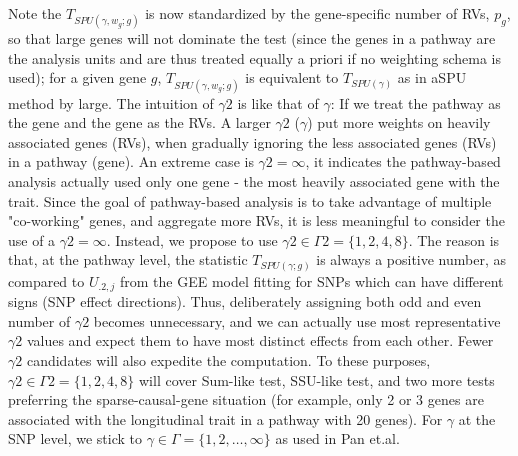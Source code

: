 \documentclass[12pt]{article}
\begin{document}
Note the $T_ { SPU(\gamma, w_g ; g) }$ is now standardized by the gene-specific number of RVs, $p_g$, so that large genes will not dominate the test (since the genes in a pathway are the analysis units and are thus treated equally a priori if no weighting schema is used); for a given gene $g$, $T_ { SPU(\gamma, w_g ; g) }$ is equivalent to $T_ { SPU(\gamma ) }$ as in aSPU method by large. The intuition of $\gamma 2$ is like that of $\gamma$: If we treat the pathway as the gene and the gene as the RVs. A larger $\gamma 2$ ($\gamma$) put more weights on heavily associated genes (RVs), when gradually ignoring the less associated genes (RVs) in a pathway (gene). An extreme case is $\gamma 2 = \infty$, it indicates the pathway-based analysis actually used only one gene - the most heavily associated gene with the trait. Since the goal of pathway-based analysis is to take advantage of multiple "co-working" genes, and aggregate more RVs, it is less meaningful to consider the use of a $\gamma 2= \infty$. Instead, we propose to use $\gamma 2 \in \Gamma 2 = \{1,2,4,8\}$. The reason is that, at the pathway level, the statistic $T_ { SPU(\gamma ; g) }$ is always a positive number, as compared to $U_{.2,j}$ from the GEE model fitting for SNPs which can have different signs (SNP effect directions). Thus, deliberately assigning both odd and even number of $\gamma 2$ becomes unnecessary, and we can actually use most representative $\gamma 2$ values and expect them to have most distinct effects from each other. Fewer $\gamma 2$ candidates will also expedite the computation. To these purposes, $\gamma 2 \in \Gamma 2 = \{1,2,4,8\}$ will cover Sum-like test, SSU-like test, and two more tests preferring the sparse-causal-gene situation (for example, only 2 or 3 genes are associated with the longitudinal trait in a pathway with 20 genes). For $\gamma$ at the SNP level, we stick to $\gamma \in \Gamma = \{1,2,\ldots,\infty\}$ as used in Pan et.al.\cite{pan2014powerful}
\end{document}
